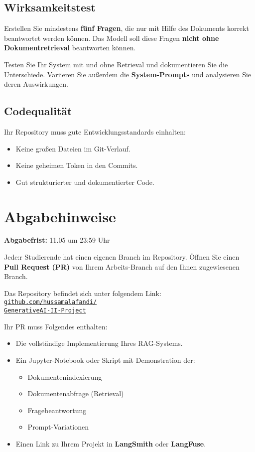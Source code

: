 \documentclass[12pt]{article}
\begin{document}
\subsection*{Wirksamkeitstest}
Erstellen Sie mindestens \textbf{fünf Fragen}, die nur mit Hilfe des Dokuments korrekt beantwortet werden können. Das Modell soll diese Fragen \textbf{nicht ohne Dokumentretrieval} beantworten können.

Testen Sie Ihr System mit und ohne Retrieval und dokumentieren Sie die Unterschiede. Variieren Sie außerdem die \textbf{System-Prompts} und analysieren Sie deren Auswirkungen.

\subsection*{Codequalität}
Ihr Repository muss gute Entwicklungsstandards einhalten:
\begin{itemize}[noitemsep]
  \item Keine großen Dateien im Git-Verlauf.
  \item Keine geheimen Token in den Commits.
  \item Gut strukturierter und dokumentierter Code.
\end{itemize}

\section*{Abgabehinweise}

\textcolor{linkblue}{\textbf{Abgabefrist:} 11.05 um 23:59 Uhr}

Jede:r Studierende hat einen eigenen Branch im Repository. Öffnen Sie einen \textcolor{linkblue}{\textbf{Pull Request (PR)}} von Ihrem Arbeits-Branch auf den Ihnen zugewiesenen Branch.

Das Repository befindet sich unter folgendem Link:
\href{https://github.com/hussamalafandi/GenerativeAI-II-Project}{%
  \texttt{github.com/hussamalafandi/\\GenerativeAI-II-Project}}

Ihr PR muss Folgendes enthalten:
\begin{itemize}[noitemsep]
  \item Die vollständige Implementierung Ihres RAG-Systems.
  \item Ein Jupyter-Notebook oder Skript mit Demonstration der:
        \begin{itemize}[noitemsep]
          \item Dokumentenindexierung
          \item Dokumentenabfrage (Retrieval)
          \item Fragebeantwortung
          \item Prompt-Variationen
        \end{itemize}
  \item Einen Link zu Ihrem Projekt in \textbf{LangSmith} oder \textbf{LangFuse}.
\end{itemize}
\end{document}
